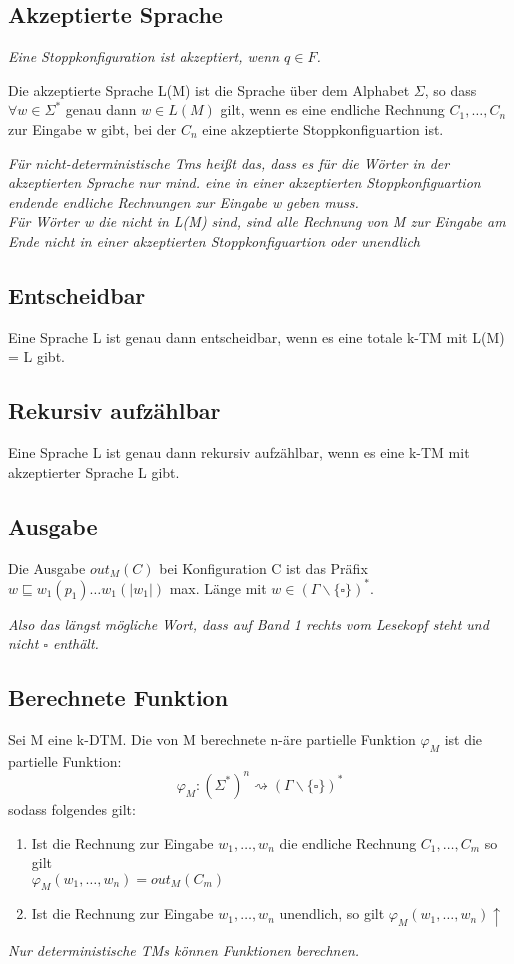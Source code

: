 \documentclass[DIV=15]{scrartcl}
\begin{document}
\subsection{Akzeptierte Sprache}
    \textit{Eine Stoppkonfiguration ist akzeptiert, wenn \(q\in F\).}\par\bigskip
    Die akzeptierte Sprache L(M) ist die Sprache über dem Alphabet \(\Sigma\), so dass \(\forall w\in\Sigma^*\) genau dann 
    \(w\in L(M)\) gilt, wenn es eine endliche Rechnung \(C_1,\dots,C_n\) zur Eingabe w gibt, bei der \(C_n\) eine 
    akzeptierte Stoppkonfiguartion ist.\par\bigskip
    \textit{Für nicht-deterministische Tms heißt das, dass es für die Wörter in der akzeptierten Sprache nur mind. eine in einer 
    akzeptierten Stoppkonfiguartion endende endliche Rechnungen zur Eingabe w geben muss.\\
    Für Wörter w die nicht in L(M) sind, sind alle Rechnung von M zur Eingabe am Ende nicht in einer akzeptierten Stoppkonfiguartion oder unendlich}
\subsection{Entscheidbar}
    Eine Sprache L ist genau dann entscheidbar, wenn es eine totale k-TM mit L(M) = L gibt.
\subsection{Rekursiv aufzählbar}
    Eine Sprache L ist genau dann rekursiv aufzählbar, wenn es eine k-TM mit akzeptierter Sprache L gibt.
\subsection{Ausgabe} 
    Die Ausgabe \(out_M(C)\) bei Konfiguration C ist das Präfix \(w\sqsubseteq w_1(p_1)\dots w_1(|w_1|)\) max. Länge mit 
    \(w\in (\Gamma\backslash\{\square\})^*\).\par\bigskip
    \textit{Also das längst mögliche Wort, dass auf Band 1 rechts vom Lesekopf steht und nicht \(\square\) enthält.}
\subsection{Berechnete Funktion}
    Sei M eine k-DTM. Die von M berechnete n-äre partielle Funktion \(\varphi_M\) ist die partielle Funktion:
    \[\varphi_M:(\Sigma^*)^n\rightsquigarrow(\Gamma\backslash\{\square\})^*\]
    sodass folgendes gilt:
    \begin{enumerate}
        \item Ist die Rechnung zur Eingabe \(w_1,\dots,w_n\) die endliche Rechnung \(C_1,\dots,C_m\) so gilt\\ 
        \(\varphi_M(w_1,\dots,w_n)=out_M(C_m)\)
        \item Ist die Rechnung zur Eingabe \(w_1,\dots,w_n\) unendlich, so gilt \(\varphi_M(w_1,\dots,w_n)\uparrow\)
    \end{enumerate}\bigskip
    \textit{Nur deterministische TMs können Funktionen berechnen.}
\end{document}
